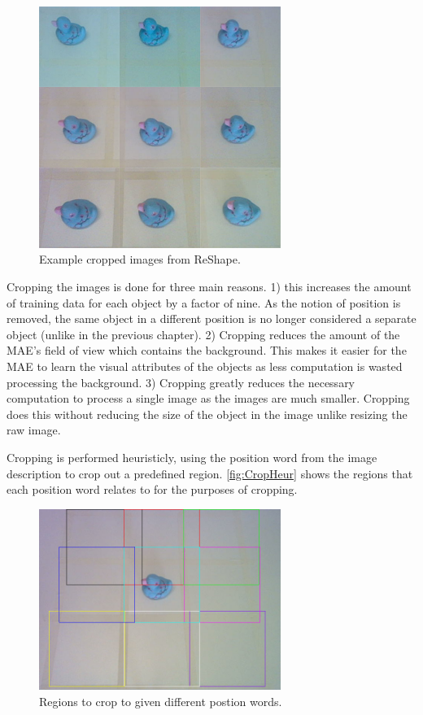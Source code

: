 \begin{figure}[h]
    \centering
    \includegraphics[width=0.7\textwidth]{Figs/chapter6/ReShapeCrop.png}
    \caption{Example cropped images from ReShape.}
    \label{fig:ReShapeCrop}
\end{figure}

Cropping the images is done for three main reasons. 1) this increases the amount of training data for each object by a factor of nine. As the notion of position is removed, the same object in a different position is no longer considered a separate object (unlike in the previous chapter). 2) Cropping reduces the amount of the \ac{MAE}'s field of view which contains the background. This makes it easier for the \ac{MAE} to learn the visual attributes of the objects as less computation is wasted processing the background. 3) Cropping greatly reduces the necessary computation to process a single image as the images are much smaller. Cropping does this without reducing the size of the object in the image unlike resizing the raw image.

Cropping is performed heuristicly, using the position word from the image description to crop out a predefined region. \autoref{fig:CropHeur} shows the regions that each position word relates to for the purposes of cropping.

\begin{figure}[ht]
    \centering
    \includegraphics[width=0.7\textwidth]{Figs/chapter6/cropHeuristics.png}
    \caption{Regions to crop to given different postion words.}
    \label{fig:CropHeur}
\end{figure}


